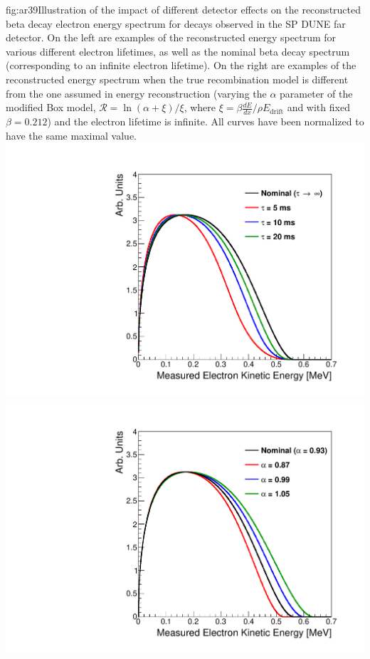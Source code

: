 \begin{dunefigure}{fig:ar39}{Illustration of the impact of different detector effects on the reconstructed  beta decay electron energy spectrum for decays observed in the SP DUNE far detector.  On the left are examples of the reconstructed energy spectrum for various different electron lifetimes, as well as the nominal 
 beta decay spectrum (corresponding to an infinite electron lifetime).  On the right are examples of the reconstructed energy spectrum when the true recombination model is different from the one assumed in energy reconstruction (varying the $\alpha$ parameter of the modified Box model, $\mathcal{R} = \ln(\alpha + \xi)/\xi$, where $\xi = \beta\frac{dE}{dx}/{\rho}E_{\mathrm{drift}}$ and with fixed $\beta = 0.212$) and the electron lifetime is infinite.  All curves have been normalized to have the same maximal value.}
\includegraphics[width=.49\textwidth]{graphics/Ar39_energyPlot_DUNESPFD_lifetime.pdf}
\includegraphics[width=.49\textwidth]{graphics/Ar39_energyPlot_DUNESPFD_recomb.pdf}
\end{dunefigure}